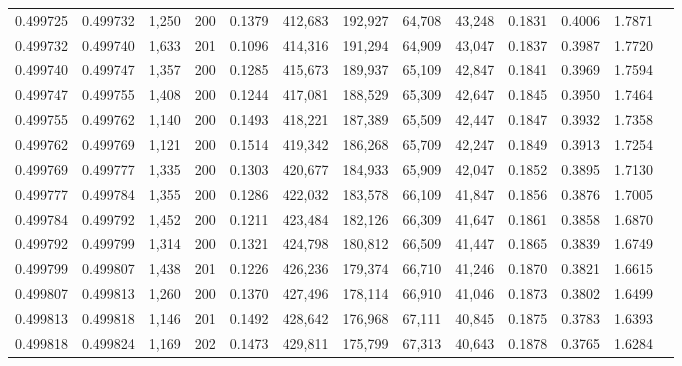 \begin{tabular}{rrrrrrrrrrrrr}
0.499725 & 0.499732 & 1,250 & 200 &                                     0.1379 & 412,683 & 192,927 &  64,708 &  43,248 & 0.1831 & 0.4006 & 1.7871 \\
0.499732 & 0.499740 & 1,633 & 201 &                                     0.1096 & 414,316 & 191,294 &  64,909 &  43,047 & 0.1837 & 0.3987 & 1.7720 \\
0.499740 & 0.499747 & 1,357 & 200 &                                     0.1285 & 415,673 & 189,937 &  65,109 &  42,847 & 0.1841 & 0.3969 & 1.7594 \\
0.499747 & 0.499755 & 1,408 & 200 &                                     0.1244 & 417,081 & 188,529 &  65,309 &  42,647 & 0.1845 & 0.3950 & 1.7464 \\
0.499755 & 0.499762 & 1,140 & 200 &                                     0.1493 & 418,221 & 187,389 &  65,509 &  42,447 & 0.1847 & 0.3932 & 1.7358 \\
0.499762 & 0.499769 & 1,121 & 200 &                                     0.1514 & 419,342 & 186,268 &  65,709 &  42,247 & 0.1849 & 0.3913 & 1.7254 \\
0.499769 & 0.499777 & 1,335 & 200 &                                     0.1303 & 420,677 & 184,933 &  65,909 &  42,047 & 0.1852 & 0.3895 & 1.7130 \\
0.499777 & 0.499784 & 1,355 & 200 &                                     0.1286 & 422,032 & 183,578 &  66,109 &  41,847 & 0.1856 & 0.3876 & 1.7005 \\
0.499784 & 0.499792 & 1,452 & 200 &                                     0.1211 & 423,484 & 182,126 &  66,309 &  41,647 & 0.1861 & 0.3858 & 1.6870 \\
0.499792 & 0.499799 & 1,314 & 200 &                                     0.1321 & 424,798 & 180,812 &  66,509 &  41,447 & 0.1865 & 0.3839 & 1.6749 \\
0.499799 & 0.499807 & 1,438 & 201 &                                     0.1226 & 426,236 & 179,374 &  66,710 &  41,246 & 0.1870 & 0.3821 & 1.6615 \\
0.499807 & 0.499813 & 1,260 & 200 &                                     0.1370 & 427,496 & 178,114 &  66,910 &  41,046 & 0.1873 & 0.3802 & 1.6499 \\
0.499813 & 0.499818 & 1,146 & 201 &                                     0.1492 & 428,642 & 176,968 &  67,111 &  40,845 & 0.1875 & 0.3783 & 1.6393 \\
0.499818 & 0.499824 & 1,169 & 202 &                                     0.1473 & 429,811 & 175,799 &  67,313 &  40,643 & 0.1878 & 0.3765 & 1.6284 \\

\end{tabular}
